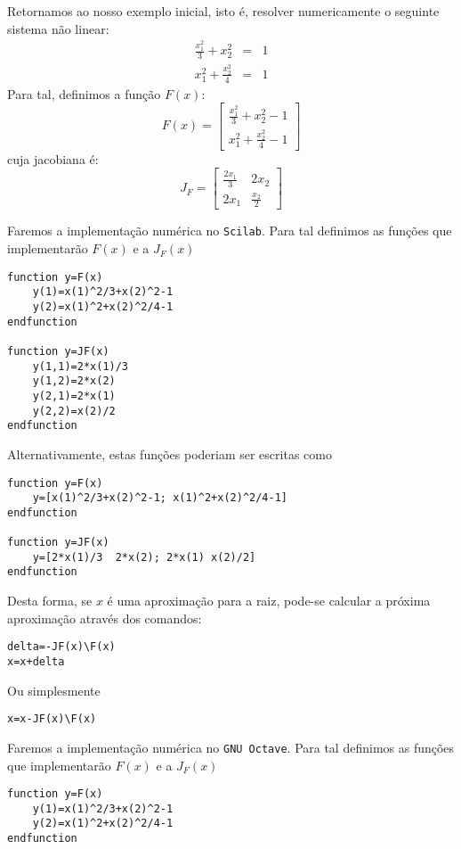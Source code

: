 \begin{ex} Retornamos ao nosso exemplo inicial, isto é, resolver numericamente o seguinte sistema não linear:
\begin{eqnarray}
\frac{x_1^2}{3}+x_2^2&=&1\\
x_1^2+\frac{x_2^2}{4}&=&1
\end{eqnarray}
Para tal, definimos a função $F(x)$:
\begin{equation}
  F(x)=\left[
\begin{array}{c}
\displaystyle \frac{x_1^2}{3}+x_2^2-1\\
\displaystyle x_1^2+\frac{x_2^2}{4}-1
\end{array}
\right]
\end{equation}
cuja jacobiana é:
\begin{equation}
  J_F=\left[\begin{array}{cc}
      \displaystyle \frac{2x_1}{3} & 2x_2\\
      \displaystyle 2x_1&\frac{x_2}{2}
    \end{array}\right]
\end{equation}

\ifisscilab
Faremos a implementação numérica no \verb+Scilab+. Para tal definimos as funções que implementarão $F(x)$ e a $J_F(x)$
\begin{verbatim}
function y=F(x)
    y(1)=x(1)^2/3+x(2)^2-1
    y(2)=x(1)^2+x(2)^2/4-1
endfunction

function y=JF(x)
    y(1,1)=2*x(1)/3
    y(1,2)=2*x(2)
    y(2,1)=2*x(1)
    y(2,2)=x(2)/2
endfunction
\end{verbatim}
Alternativamente, estas funções poderiam ser escritas como
\begin{verbatim}
function y=F(x)
    y=[x(1)^2/3+x(2)^2-1; x(1)^2+x(2)^2/4-1]
endfunction

function y=JF(x)
    y=[2*x(1)/3  2*x(2); 2*x(1) x(2)/2]
endfunction
\end{verbatim}
Desta forma, se $x$ é uma aproximação para a raiz, pode-se calcular a próxima aproximação através dos comandos:
\begin{verbatim}
delta=-JF(x)\F(x)
x=x+delta
\end{verbatim}
Ou simplesmente
\begin{verbatim}
x=x-JF(x)\F(x)
\end{verbatim}
\fi
\ifisoctave
Faremos a implementação numérica no \verb+GNU Octave+. Para tal definimos as funções que implementarão $F(x)$ e a $J_F(x)$
\begin{verbatim}
function y=F(x)
    y(1)=x(1)^2/3+x(2)^2-1
    y(2)=x(1)^2+x(2)^2/4-1
endfunction


\end{verbatim}
\end{ex}
